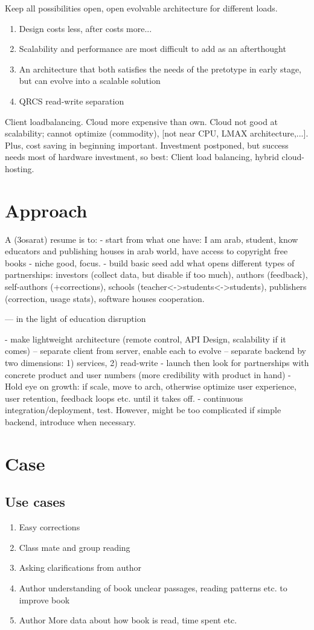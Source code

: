 \documentclass[a4paper,10pt]{book}
\begin{document}
Keep all possibilities open, open evolvable architecture for different loads.
\begin{enumerate}
\item Design costs less, after costs more...
\item Scalability and performance are most difficult to add as an afterthought
\item An architecture that both satisfies the needs of the pretotype in early stage, but can evolve
    into a scalable solution
\item QRCS read-write separation
\end{enumerate}

Client loadbalancing.
Cloud more expensive than own. Cloud not good at scalability; cannot optimize (commodity), [not near CPU, LMAX architecture,...].
Plus, cost saving in beginning important. Investment postponed, but success needs most of hardware investment, so best:
Client load balancing, hybrid cloud-hosting.

\section{Approach}
A (3osarat) resume is to:
- start from what one have: I am arab, student, know educators and publishing houses in arab world, have access to copyright free books
- niche good, focus.
- build basic seed add what opens different types of partnerships: investors (collect data, but disable if too much), authors (feedback), 
self-authors (+corrections), schools (teacher<->students<->students), publishers (correction, usage stats), software houses cooperation.

--- in the light of education disruption

- make lightweight architecture (remote control, API Design, scalability if it comes)
-- separate client from server, enable each to evolve 
-- separate backend by two dimensions: 1) services, 2) read-write
- launch then look for partnerships with concrete product and user numbers (more credibility with product in hand)
- Hold eye on growth: if scale, move to arch, otherwise optimize user experience, user retention, feedback loops etc. until it takes off.
- continuous integration/deployment, test. However, might be too complicated if simple backend, introduce when necessary.


\section{Case}
\subsection{Use cases}
\begin{enumerate}
\item Easy corrections
\item Class mate and group reading
\item Asking clarifications from author
\item Author understanding of book unclear passages, reading patterns etc. to improve book
\item Author More data about how book is read, time spent etc.
\end{enumerate}
 
\end{document}
